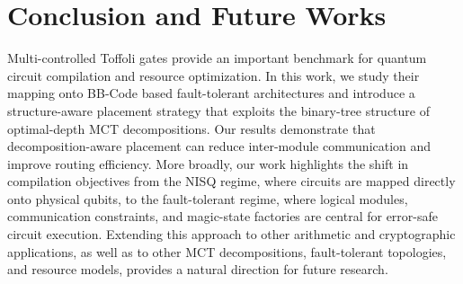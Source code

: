 \documentclass[sigconf]{acmart}
\begin{document}




\section{Conclusion and Future Works}
\label{sec:con}
Multi-controlled Toffoli gates provide an important benchmark for quantum circuit compilation and resource optimization. In this work, we study their mapping onto BB-Code based fault-tolerant architectures and introduce a structure-aware placement strategy that exploits the binary-tree structure of optimal-depth MCT decompositions. Our results demonstrate that decomposition-aware placement can reduce inter-module communication and improve routing efficiency. More broadly, our work highlights the shift in compilation objectives from the NISQ regime, where circuits are mapped directly onto physical qubits, to the fault-tolerant regime, where logical modules, communication constraints, and magic-state factories are central for error-safe circuit execution. Extending this approach to other arithmetic and cryptographic applications, as well as to other MCT decompositions, fault-tolerant topologies, and resource models, provides a natural direction for future research.



\end{document}
